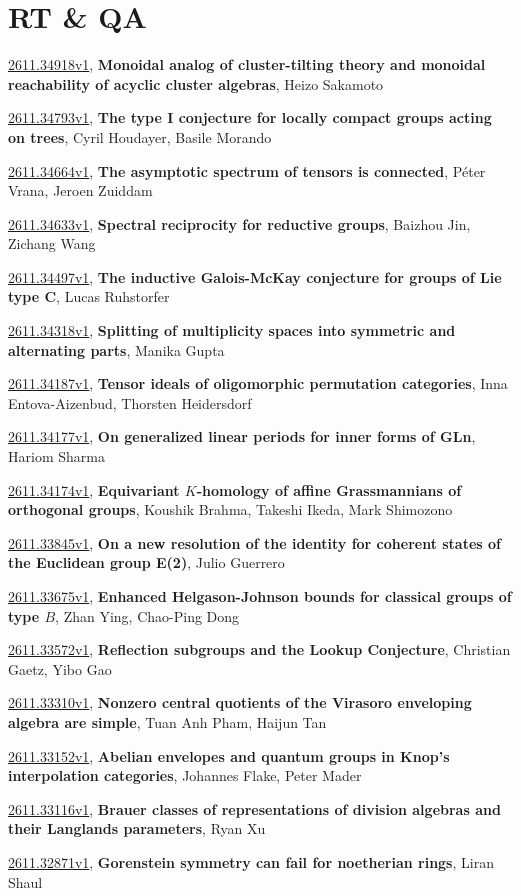 \documentclass[9pt, a4paper]{article}
\theoremstyle{plain}
\theoremstyle{definition}
\theoremstyle{remark}
\newcommand{\arxiv}[3]{\href{https://arxiv.org/abs/#1}{#1}, \textbf{\textcolor{arxivblue}{#2}}, #3}
\begin{document}

\section{RT \& QA}
\arxiv{2611.34918v1}{Monoidal analog of cluster-tilting theory and monoidal reachability of acyclic cluster algebras}{Heizo Sakamoto}

\arxiv{2611.34793v1}{The type I conjecture for locally compact groups acting on trees}{Cyril Houdayer, Basile Morando}

\arxiv{2611.34664v1}{The asymptotic spectrum of tensors is connected}{Péter Vrana, Jeroen Zuiddam}

\arxiv{2611.34633v1}{Spectral reciprocity for reductive groups}{Baizhou Jin, Zichang Wang}

\arxiv{2611.34497v1}{The inductive Galois-McKay conjecture for groups of Lie type C}{Lucas Ruhstorfer}

\arxiv{2611.34318v1}{Splitting of multiplicity spaces into symmetric and alternating parts}{Manika Gupta}

\arxiv{2611.34187v1}{Tensor ideals of oligomorphic permutation categories}{Inna Entova-Aizenbud, Thorsten Heidersdorf}

\arxiv{2611.34177v1}{On generalized linear periods for inner forms of GLn}{Hariom Sharma}

\arxiv{2611.34174v1}{Equivariant $K$-homology of affine Grassmannians of orthogonal groups}{Koushik Brahma, Takeshi Ikeda, Mark Shimozono}

\arxiv{2611.33845v1}{On a new resolution of the identity for coherent states of the Euclidean group E(2)}{Julio Guerrero}

\arxiv{2611.33675v1}{Enhanced Helgason-Johnson bounds for classical groups of type $B$}{Zhan Ying, Chao-Ping Dong}

\arxiv{2611.33572v1}{Reflection subgroups and the Lookup Conjecture}{Christian Gaetz, Yibo Gao}

\arxiv{2611.33310v1}{Nonzero central quotients of the Virasoro enveloping algebra are simple}{Tuan Anh Pham, Haijun Tan}

\arxiv{2611.33152v1}{Abelian envelopes and quantum groups in Knop's interpolation categories}{Johannes Flake, Peter Mader}

\arxiv{2611.33116v1}{Brauer classes of representations of division algebras and their Langlands parameters}{Ryan Xu}

\arxiv{2611.32871v1}{Gorenstein symmetry can fail for noetherian rings}{Liran Shaul}
\end{document}
